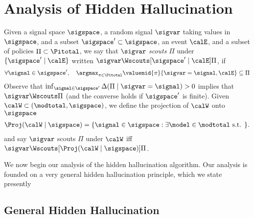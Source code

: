 
\section{Analysis of Hidden Hallucination}


Given a signal space $\sigspace$, a random signal $\sigvar$ taking values in $\sigspace$, and a subset $\sigspace' \subset \sigspace$, an event $\calE$, and a subset of policies $\Pi \subset \Pitotal$, we say that $\sigvar$ \emph{scouts} $\Pi$ under  $\{\sigspace'\mid\calE\}$ written $\sigvar \Wscouts[\sigspace' \mid \calE] \Pi$, if
\begin{align}
 \forall \signal \in \sigspace', \quad \argmax_{\pi \in \Pitotal} \valuemid{\pi}{\sigvar = \signal,\calE} \subseteq \Pi 
\end{align}
Observe that  $ \inf_{\signal \in \sigspace'} \Delta(\Pi \mid \sigvar = \signal) > 0$ implies that $\sigvar \Wscouts \Pi$ (and the converse holds if $\sigspace'$ is finite). Given $\calW \subset (\modtotal,\sigspace)$, we define the projection of $\calW$ onto $\sigspace$
\begin{align}\Proj(\calW \mid \sigspace) = \{\signal \in \sigspace : \exists \model \in \modtotal \text{ s.t. } \}.
\end{align}
and say $\sigvar$ scouts $\Pi$ under $\calW$ iff $\sigvar \Wscouts[\Proj(\calW \mid \sigspace)] \Pi$.



We now begin our analysis of the hidden hallucination algorithm. Our analysis is founded on a very general hidden hallucination principle, which we state presently


\newcommand{\asri}{\textsf{ASRI}}

\newcommand{\trusttext}{tru}
\newcommand{\prhal}{\kernel_{\mathrm{hal}}}

\newcommand{\Prtrust}{\mathbb{P}_{\mathrm{\trusttext}}}
\newcommand{\PrStrust}{\mathbb{P}_{\sigvartrust}}
\newcommand{\sigtrust}{\signal_{\mathrm{\trusttext}}}


\newcommand{\asrHH}{\textsf{ASR}\text{-}\textsf{HH}}
\newcommand{\Zhh}{\calW_{\mathrm{hh}}}
\subsection{General Hidden Hallucination}
\newcommand{\Prhal}{\mathbb{P}_{\mathrm{hal}}}

\newcommand{\Bhide}{\mathbf{B}_{\mathrm{hide}}}

